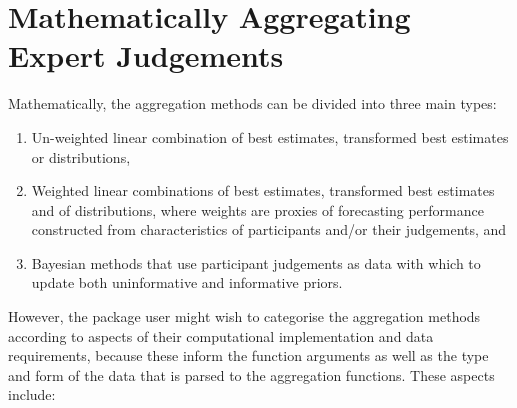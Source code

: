 \documentclass[article]{jss}
\providecommand{\tightlist}{%
  \setlength{\itemsep}{0pt}\setlength{\parskip}{0pt}}
\begin{document}
\section{Mathematically Aggregating Expert
Judgements}\label{mathematically-aggregating-expert-judgements}

Mathematically, the aggregation methods can be divided into three main
types:

\begin{enumerate}
\def\labelenumi{\arabic{enumi}.}
\tightlist
\item
  Un-weighted linear combination of best estimates, transformed best
  estimates or distributions,
\item
  Weighted linear combinations of best estimates, transformed best
  estimates and of distributions, where weights are proxies of
  forecasting performance constructed from characteristics of
  participants and/or their judgements, and
\item
  Bayesian methods that use participant judgements as data with which to
  update both uninformative and informative priors.
\end{enumerate}

However, the  package user might wish to categorise the
aggregation methods according to aspects of their computational
implementation and data requirements, because these inform the function
arguments as well as the type and form of the data that is parsed to the
aggregation functions. These aspects include:
\end{document}
